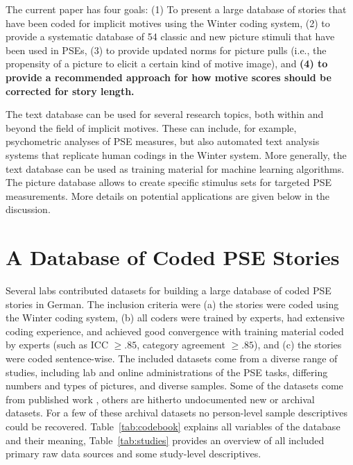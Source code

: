 \documentclass[man,a4paper,mask]{apa6}\usepackage[]{graphicx}\usepackage[]{color}
\newcommand{\added}[1]{\textcolor{colour_added}{\bf{#1}}}
\begin{document}
The current paper has four goals: (1) To present a large database of stories that have been coded for implicit motives using the Winter coding system, (2) to provide a systematic database of 54 classic and new picture stimuli that have been used in PSEs, (3) to provide updated norms for picture pulls (i.e., the propensity of a picture to elicit a certain kind of motive image), and \added{(4) to provide a recommended approach for how motive scores should be corrected for story length.}

The text database can be used for several research topics, both within and beyond the field of implicit motives. These can include, for example, psychometric analyses of PSE measures, but also automated text analysis systems that replicate human codings in the Winter system. More generally, the text database can be used as training material for machine learning algorithms. The picture database allows to create specific stimulus sets for targeted PSE measurements. More details on potential applications are given below in the discussion.


\section{A Database of Coded PSE Stories}

Several labs contributed datasets for building a large database of coded PSE stories in German. The inclusion criteria were (a) the stories were coded using the Winter coding system, (b) all coders were trained by experts, had extensive coding experience, and achieved good convergence with training material coded by experts (such as ICC $\geq .85$, category agreement $\geq .85$), and (c) the stories were coded sentence-wise.
The included datasets come from a diverse range of studies, including lab and online administrations of the PSE tasks, differing numbers and types of pictures, and diverse samples. Some of the datasets come from published work \parencite{kollner_SocialBiopsychologyImplicit_2018,kollner_InfluenceImplicitMotives_2015,janson_InhibitedPowerMotivation_2018a,janson_ImplicitPowerMotive_2017,zygar_EinflussEmotionalerIntelligenz_2013,czikmantori_ExperienceIntrinsicMotivation_2018}, others are hitherto undocumented new or archival datasets. For a few of these archival datasets no person-level sample descriptives could be recovered. Table~\ref{tab:codebook} explains all variables of the database and their meaning, Table~\ref{tab:studies} provides an overview of all included primary raw data sources and some study-level descriptives.
\end{document}
